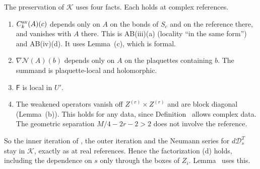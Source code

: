 \begin{detail}
\begin{step}
The preservation of $\mathcal K$ uses four facts. Each holds at complex references.
\begin{enumerate}[label=(k\arabic*)]
\item $C^{\rm av}_k(A)(c)$ depends only on $A$ on the bonds of $S_c$ and on the reference there, and vanishes with $A$ there. This is AB(iii)(a) (locality ``in the same form'') and AB(iv)(d). It uses Lemma~(c), which is formal.
\item $\nabla\mathcal N(A)(b)$ depends only on $A$ on the plaquettes containing $b$. The summand is plaquette-local and holomorphic.
\item $\mathsf F$ is local in $U'$.
\item The weakened operators vanish off $Z^{(r)}\times Z^{(r)}$ and are block diagonal (Lemma~(b)). This holds for any data, since Definition~ allows complex data. The geometric separation $M/4-2r-2>2$ does not involve the reference.
\end{enumerate}
So the inner iteration of , the outer iteration and the Neumann series for $d\mathcal D_s^T$ stay in $\mathcal K$, exactly as at real references. Hence the factorization (d) holds, including the dependence on $s$ only through the boxes of $Z_i$. Lemma~ uses this.
\end{step}
\end{detail}


